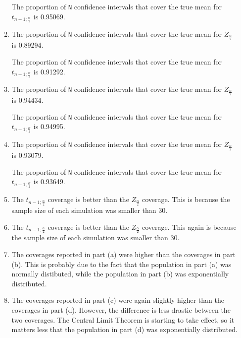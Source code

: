 \documentclass[12pt,letterpaper]{article}
\begin{document}
\begin{enumerate}
\begin{enumerate}
          The proportion of \texttt{N} confidence intervals that cover the true mean for $t_{n - 1; \frac{\alpha}{2}}$ is \num{0.95069}.
        \item
          The proportion of \texttt{N} confidence intervals that cover the true mean for $Z_{\frac{\alpha}{2}}$ is \num{0.89294}.

          The proportion of \texttt{N} confidence intervals that cover the true mean for $t_{n - 1; \frac{\alpha}{2}}$ is \num{0.91292}.
        \item
          The proportion of \texttt{N} confidence intervals that cover the true mean for $Z_{\frac{\alpha}{2}}$ is \num{0.94434}.

          The proportion of \texttt{N} confidence intervals that cover the true mean for $t_{n - 1; \frac{\alpha}{2}}$ is \num{0.94995}.
        \item
          The proportion of \texttt{N} confidence intervals that cover the true mean for $Z_{\frac{\alpha}{2}}$ is \num{0.93079}.

          The proportion of \texttt{N} confidence intervals that cover the true mean for $t_{n - 1; \frac{\alpha}{2}}$ is \num{0.93649}.
        \item
          The $t_{n - 1; \frac{\alpha}{2}}$ coverage is better than the $Z_{\frac{\alpha}{2}}$ coverage.
          This is because the sample size of each simulation was smaller than 30.
        \item
          The $t_{n - 1; \frac{\alpha}{2}}$ coverage is better than the $Z_{\frac{\alpha}{2}}$ coverage.
          This again is because the sample size of each simulation was smaller than 30.
        \item
          The coverages reported in part (a) were higher than the coverages in part (b).
          This is probably due to the fact that the population in part (a) was normally distibuted,
          while the population in part (b) was exponentially distributed.
        \item
          The coverages reported in part (c) were again slightly higher than the coverages in part (d).
          However, the difference is less drastic between the two coverages.
          The Central Limit Theorem is starting to take effect,
          so it matters less that the population in part (d) was exponentially distributed.
      \end{enumerate}
  \end{enumerate}

  
\end{document}
